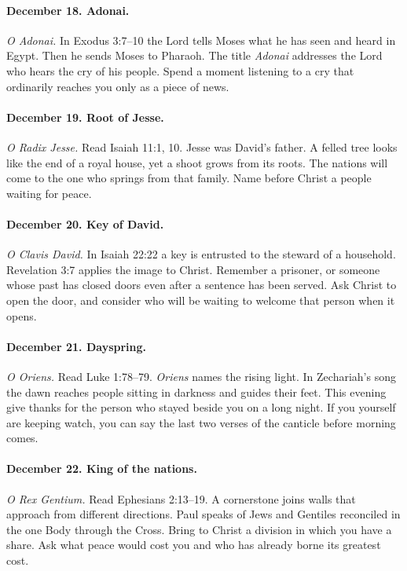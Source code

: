 \paragraph{December 18. Adonai.} \emph{O Adonai.} In Exodus 3:7--10 the Lord tells Moses what he has seen and heard in Egypt. Then he sends Moses to Pharaoh. The title \emph{Adonai} addresses the Lord who hears the cry of his people. Spend a moment listening to a cry that ordinarily reaches you only as a piece of news.

\paragraph{December 19. Root of Jesse.} \emph{O Radix Jesse.} Read Isaiah 11:1, 10. Jesse was David's father. A felled tree looks like the end of a royal house, yet a shoot grows from its roots. The nations will come to the one who springs from that family. Name before Christ a people waiting for peace.

\paragraph{December 20. Key of David.} \emph{O Clavis David.} In Isaiah 22:22 a key is entrusted to the steward of a household. Revelation 3:7 applies the image to Christ. Remember a prisoner, or someone whose past has closed doors even after a sentence has been served. Ask Christ to open the door, and consider who will be waiting to welcome that person when it opens.

\paragraph{December 21. Dayspring.} \emph{O Oriens.} Read Luke 1:78--79. \emph{Oriens} names the rising light. In Zechariah's song the dawn reaches people sitting in darkness and guides their feet. This evening give thanks for the person who stayed beside you on a long night. If you yourself are keeping watch, you can say the last two verses of the canticle before morning comes.

\paragraph{December 22. King of the nations.} \emph{O Rex Gentium.} Read Ephesians 2:13--19. A cornerstone joins walls that approach from different directions. Paul speaks of Jews and Gentiles reconciled in the one Body through the Cross. Bring to Christ a division in which you have a share. Ask what peace would cost you and who has already borne its greatest cost.

